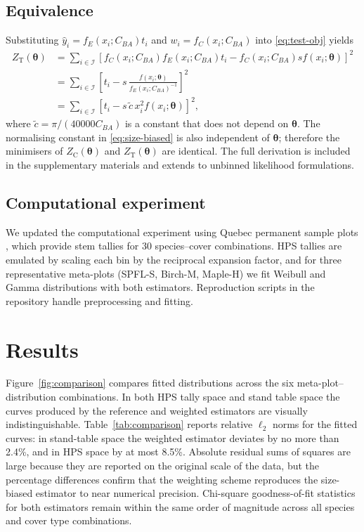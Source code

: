 \documentclass[12pt]{article}
\begin{document}
\subsection{Equivalence}
Substituting $\hat{y}_i = f_E(x_i; C_{BA}) t_i$ and $w_i = f_C(x_i; C_{BA})$
into \eqref{eq:test-obj} yields
\begin{align}
  Z_{\text{T}}(\boldsymbol{\theta})
    &= \sum_{i \in \mathcal{I}}
       \left[f_C(x_i; C_{BA}) f_E(x_i; C_{BA}) t_i - f_C(x_i; C_{BA}) s f(x_i; \boldsymbol{\theta})\right]^2 \nonumber \\
    &= \sum_{i \in \mathcal{I}}
       \left[t_i - s \, \frac{f(x_i; \boldsymbol{\theta})}{f_E(x_i; C_{BA})^{-1}}\right]^2 \nonumber \\
    &= \sum_{i \in \mathcal{I}}
       \left[t_i - s \, \tilde{c} \, x_i^2 f(x_i; \boldsymbol{\theta})\right]^2,
\end{align}
where $\tilde{c} = \pi/(40000 C_{BA})$ is a constant that does not depend on
$\boldsymbol{\theta}$. The normalising constant in \eqref{eq:size-biased} is
also independent of $\boldsymbol{\theta}$; therefore the minimisers of
$Z_{\text{C}}(\boldsymbol{\theta})$ and $Z_{\text{T}}(\boldsymbol{\theta})$ are
identical. The full derivation is included in the supplementary materials and
extends to unbinned likelihood formulations.

\subsection{Computational experiment}

We updated the computational experiment using Quebec permanent sample plots
\citep{gouvernement2019}, which provide stem tallies for 30 species--cover
combinations. HPS tallies are emulated by scaling each bin by the reciprocal
expansion factor, and for three representative meta-plots (SPFL-S, Birch-M,
Maple-H) we fit Weibull and Gamma distributions with both estimators.
Reproduction scripts in the repository handle preprocessing and fitting.

\section{Results}

Figure~\ref{fig:comparison} compares fitted distributions across the six
meta-plot--distribution combinations. In both HPS tally space and stand table
space the curves produced by the reference and weighted estimators are visually
indistinguishable. Table~\ref{tab:comparison} reports relative $\ell_2$ norms
for the fitted curves: in stand-table space the weighted estimator deviates by
no more than 2.4\%, and in HPS space by at most 8.5\%. Absolute residual sums of
squares are large because they are reported on the original scale of the data,
but the percentage differences confirm that the weighting scheme reproduces the
size-biased estimator to near numerical precision. Chi-square goodness-of-fit
statistics for both estimators remain within the same order of magnitude across
all species and cover type combinations.
\end{document}
